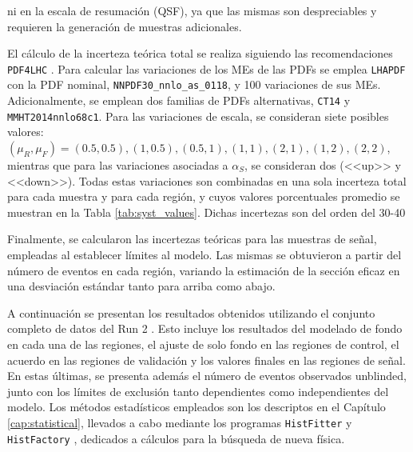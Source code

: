  ni en la escala de resumación (QSF), ya que las mismas son despreciables y requieren la generación de muestras adicionales. 


El cálculo de la incerteza teórica total se realiza siguiendo las recomendaciones \texttt{PDF4LHC} \cite{Butterworth:2015oua}.
Para calcular las variaciones de los MEs de las PDFs se emplea \texttt{LHAPDF} \cite{lhapdf} con la PDF nominal, \texttt{NNPDF30\_nnlo\_as\_0118}, y 100 variaciones de sus MEs. Adicionalmente, se emplean dos familias de PDFs alternativas, \texttt{CT14} y \texttt{MMHT2014nnlo68c1}. Para las variaciones de escala, se consideran siete posibles valores: $(\mu_R, \mu_F) = (0.5,0.5), (1,0.5), (0.5,1), (1,1), (2,1), (1,2), (2,2)$, mientras que para las variaciones asociadas a $\alpha_S$, se consideran dos (<<up>> y <<down>>). Todas estas variaciones son combinadas en una sola incerteza total para cada muestra y para cada región, y cuyos valores porcentuales promedio se muestran en la Tabla \ref{tab:syst_values}. Dichas incertezas son del orden del 30-40


Finalmente, se calcularon las incertezas teóricas para las muestras de señal, empleadas al establecer límites al modelo. Las mismas se obtuvieron a partir del número de eventos en cada región, variando la estimación de la sección eficaz en una desviación estándar tanto para arriba como abajo.



A continuación se presentan los resultados obtenidos utilizando el conjunto completo de datos del Run 2 \cite{ATLAS:2021ijy}. Esto incluye los resultados del modelado de fondo en cada una de las regiones, el ajuste de solo fondo en las regiones de control, el acuerdo en las regiones de validación y los valores finales en las regiones de señal. En estas últimas, se presenta además el número de eventos observados unblinded, junto con los límites de exclusión tanto dependientes como independientes del modelo. Los métodos estadísticos empleados son los descriptos en el Capítulo \ref{cap:statistical}, llevados a cabo mediante los programas \texttt{HistFitter} \cite{Baak_2015} y \texttt{HistFactory} \cite{Cranmer:1456844}, dedicados a cálculos para la búsqueda de nueva física.



